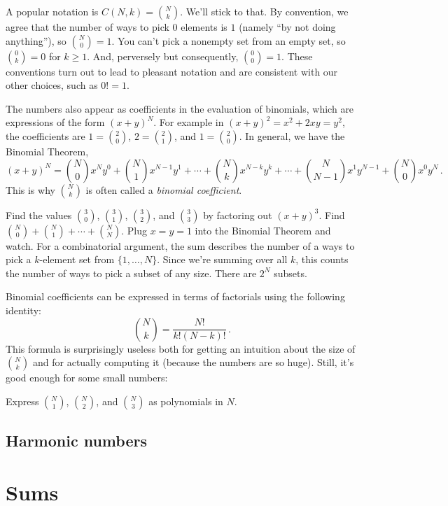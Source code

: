 \documentclass[a4paper,nobib]{tufte-handout}
\begin{document}
A popular notation is $C(N,k)=\binom{N}{k}$. We'll stick to that. 
By
convention, we agree that the number of ways to pick $0$ elements is $1$
(namely ``by not doing anything''), so $\binom{N}{0}= 1$.
You can't pick a nonempty set from an empty set, so $\binom{0}{k}=0$ for
$k\geq 1$.
And, perversely but consequently, $\binom{0}{0}=1$.
These
conventions turn out to lead to pleasant notation and are consistent
with our other choices, such as $0!=1$.

The numbers also appear as coefficients in the evaluation of
binomials, which are expressions of the form $(x+y)^N$. For example
in $(x+y)^2= x^2 + 2xy = y^2$, the coefficients are $1=\binom{2}{0}$, $2=\binom{2}{1}$, and
$1=\binom{2}{0}$. In general, we have the Binomial Theorem,
\[ (x+y)^N = \binom{N}{0} x^N y^0 +\binom{N}{1} x^{N-1}y^1+\cdots
+ \binom{N}{k} x^{N-k}y^k +\cdots+ \binom{N}{N-1} x^1y^{N-1} +
\binom{N}{0} x^0y^N\,.\] 
This is why $\binom{N}{k}$ is often called a \emph{binomial coefficient}.

\begin{ExerciseList}
  \Exercise Find the values $\binom{3}{0}$, $\binom{3}{1}$,
  $\binom{3}{2}$, and $\binom{3}{3}$ by factoring out ${(x+y)}^3$.
  \Exercise Find $\binom{N}{0}+\binom{N}{1}+\cdots+\binom{N}{N}$.
  \Answer Plug $x=y=1$ into the Binomial Theorem and watch. For a
  combinatorial argument, the sum describes the number of a ways to
  pick a $k$-element set from $\{1,\ldots, N\}$. Since we're summing
  over all $k$, this counts the number of ways to pick a subset of any
  size. There are $2^N$ subsets.
\end{ExerciseList}

Binomial coefficients can be expressed in terms of factorials using the following identity:
\[ \binom{N}{k}= \frac{N!}{k!(N-k)!}\,. \] 
This formula is surprisingly
useless both for getting an intuition about the size of $\binom{N}{k}$ and
for actually computing it (because the numbers are so huge).
Still, it's good enough for some small numbers:

\begin{ExerciseList}
  \Exercise Express $\binom{N}{1}$, $\binom{N}{2}$, and
  $\binom{N}{3}$ as polynomials in $N$.
\end{ExerciseList}

\subsection{Harmonic numbers}

\section{Sums}
\end{document}
